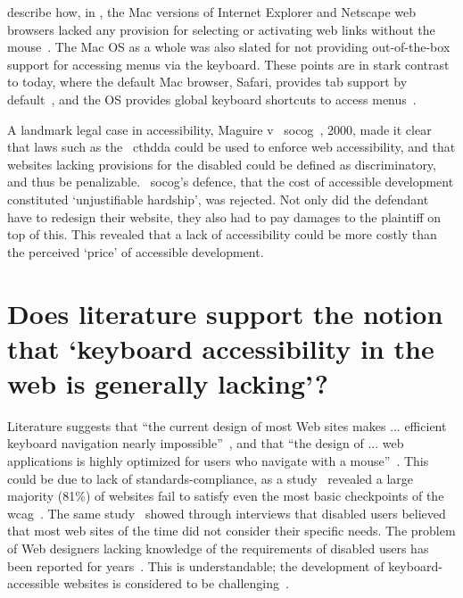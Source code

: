\documentclass[11pt,openright,a4paper]{report}
\begin{document}
\citeauthor{hendrix1997adapting} describe how, in \citeyear{hendrix1997adapting}, the Mac versions of Internet Explorer and Netscape web browsers lacked any provision for selecting or activating web links without the mouse~\cite{hendrix1997adapting}. The Mac OS as a whole was also slated for not providing out-of-the-box support for accessing menus via the keyboard. These points are in stark contrast to today, where the default Mac browser, Safari, provides tab support by default~\cite{safaria11y}, and the OS provides global keyboard shortcuts to access menus~\cite{macshortcuts}.

A landmark legal case in accessibility, Maguire v ~\gls{socog}~\cite{sloan2001web,russell2003access}, 2000, made it clear that laws such as the ~\gls{cthdda} could be used to enforce web accessibility, and that websites lacking provisions for the disabled could be defined as discriminatory, and thus be penalizable. ~\gls{socog}'s defence, that the cost of accessible development constituted `unjustifiable hardship', was rejected. Not only did the defendant have to redesign their website, they also had to pay damages to the plaintiff on top of this. This revealed that a lack of accessibility could be more costly than the perceived `price' of accessible development.
\section{Does literature support the notion that `keyboard accessibility in the web is generally lacking'?}
Literature suggests that ``the current design of most Web sites makes ... efficient keyboard navigation nearly impossible''~\parencite[][p.1]{schrepp2006efficiency}, and that ``the design of ... web applications is highly optimized for users who navigate with a mouse''~\parencite[][p.1]{schrepp2006efficiency}. This could be due to lack of standards-compliance, as a \citeyear{disability2004web} study~\cite{disability2004web} revealed a large majority (81\%) of websites fail to satisfy even the most basic checkpoints of the \gls{wcag}~\cite{chisholm2001web,wcag}. The same study~\cite{disability2004web} showed through interviews that disabled users believed that most web sites of the time did not consider their specific needs.
The problem of Web designers lacking knowledge of the requirements of disabled users has been reported for years~\cite{disability2004web,coyne2001beyond,velasco2001raising}. This is understandable; the development of keyboard-accessible websites is considered to be challenging~\cite{watanabe2012using}.
\end{document}
